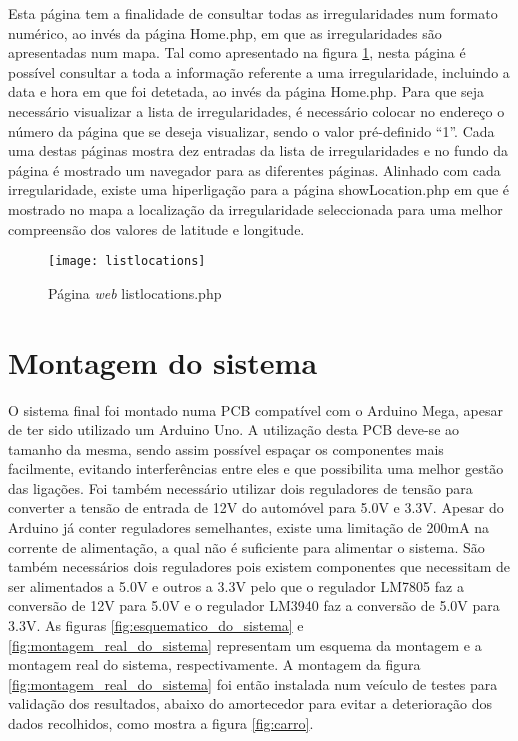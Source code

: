 Esta página tem a finalidade de consultar todas as irregularidades num formato numérico, ao invés da página Home.php, em que as irregularidades são apresentadas num mapa.
Tal como apresentado na figura \ref{fig:listlocations.php}, nesta página é possível consultar a toda a informação referente a uma irregularidade, incluindo a data e hora em que foi detetada, ao invés da página Home.php.
Para que seja necessário visualizar a lista de irregularidades, é necessário colocar no endereço o número da página que se deseja visualizar, sendo o valor pré-definido “1”.
Cada uma destas páginas mostra dez entradas da lista de irregularidades e no fundo da página é mostrado um navegador para as diferentes páginas. 
Alinhado com cada irregularidade, existe uma hiperligação para a página showLocation.php em que é mostrado no mapa a localização da irregularidade seleccionada para uma melhor compreensão dos valores de latitude e longitude.

\begin{figure}[htbp]
	\centering
	\texttt{[image: listlocations]}
	\caption{Página \emph{web} listlocations.php}
	\label{fig:listlocations.php}
\end{figure}

\section{Montagem do sistema}
\label{sec:montagem_do_sistema}

O sistema final foi montado numa PCB compatível com o Arduino Mega, apesar de ter sido utilizado um Arduino Uno.
A utilização desta PCB deve-se ao tamanho da mesma, sendo assim possível espaçar os componentes mais facilmente, evitando interferências entre eles e que possibilita uma melhor gestão das ligações.
Foi também necessário utilizar dois reguladores de tensão para converter a tensão de entrada de 12V do automóvel para 5.0V e 3.3V.
Apesar do Arduino já conter reguladores semelhantes, existe uma limitação de 200mA na corrente de alimentação, a qual não é suficiente para alimentar o sistema.
São também necessários dois reguladores pois existem componentes que necessitam de ser alimentados a 5.0V e outros a 3.3V pelo que o regulador LM7805 faz a conversão de 12V para 5.0V e o regulador LM3940 faz a conversão de 5.0V para 3.3V.
As figuras \ref{fig:esquematico_do_sistema} e \ref{fig:montagem_real_do_sistema} representam um esquema da montagem e a montagem real do sistema, respectivamente.
A montagem da figura \ref{fig:montagem_real_do_sistema} foi então instalada num veículo de testes para validação dos resultados, abaixo do amortecedor para evitar a deterioração dos dados recolhidos, como mostra a figura \ref{fig:carro}.

